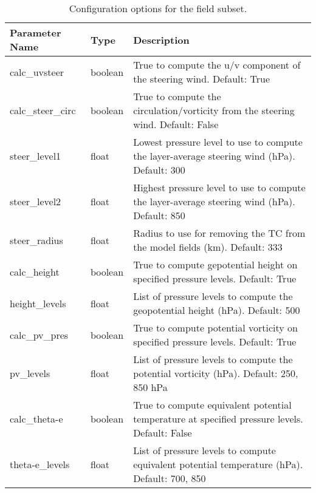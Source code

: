 \documentclass[psfig,12pt]{article}
\begin{document}
\begin{table}[H]
\caption{Configuration options for the field subset.}
\begin{center}
\begin{tabular}{|p{1.60in}|p{0.5in}|p{4.15in}|}
\hline
Parameter Name & Type & Description \\ \hline \hline

calc\_uvsteer & boolean & True to compute the u/v component of the steering wind. Default: True \\ \hline

calc\_steer\_circ & boolean & True to compute the circulation/vorticity from the steering wind.  Default:  False \\ \hline

steer\_level1 & float & Lowest pressure level to use to compute the layer-average steering wind (hPa).  Default: 300 \\ \hline

steer\_level2 & float & Highest pressure level to use to compute the layer-average steering wind (hPa).  Default: 850 \\ \hline

steer\_radius & float & Radius to use for removing the TC from the model fields (km).  Default: 333 \\ \hline

calc\_height & boolean & True to compute gepotential height on specified pressure levels.  Default:  True \\ \hline

height\_levels & float & List of pressure levels to compute the geopotential height (hPa).
Default:  500 \\ \hline

calc\_pv\_pres & boolean & True to compute potential vorticity on specified pressure levels.
Default:  True \\ \hline

pv\_levels & float & List of pressure levels to compute the potential vorticity (hPa).  
Default:  250, 850 hPa \\ \hline  

calc\_theta-e & boolean & True to compute equivalent potential temperature at specified pressure levels.
Default:  False \\ \hline

theta-e\_levels & float & List of pressure levels to compute equivalent potential temperature (hPa).
Default:  700, 850 \\ \hline


\end{tabular}
\end{center}
\end{table}
\end{document}
